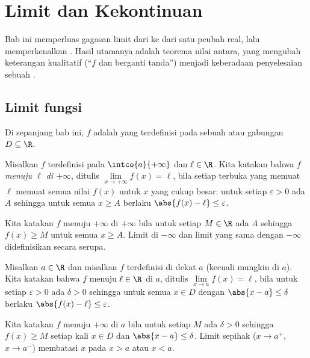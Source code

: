 \chapter{Limit dan Kekontinuan}\label{ch:g12:limcont}

Bab ini memperluas gagasan limit dari  ke  dari satu peubah
real, lalu memperkenalkan . Hasil utamanya adalah teorema
nilai antara, yang mengubah keterangan kualitatif (``$f$  dan berganti
tanda'') menjadi keberadaan penyelesaian sebuah .

\section{Limit fungsi}

Di sepanjang bab ini, $f$ adalah  yang terdefinisi pada sebuah 
atau gabungan  $D \subseteq \R$.

\begin{definition}\label{def:g12:limcont:liminf}
Misalkan $f$ terdefinisi pada  $\intco{a}{+\infty}$ dan $\ell \in \R$.
Kita katakan bahwa $f$ \emph{menuju $\ell$ di $+\infty$},
ditulis $\lim\limits_{x\to+\infty} f(x) = \ell$, bila setiap  terbuka
yang memuat $\ell$ memuat semua nilai $f(x)$ untuk $x$ yang cukup besar:
untuk setiap $\varepsilon > 0$ ada $A$ sehingga untuk semua $x \geq A$
berlaku $\abs{f(x) - \ell} \leq \varepsilon$.

Kita katakan $f$ menuju $+\infty$ di $+\infty$ bila untuk setiap $M \in \R$ ada
$A$ sehingga $f(x) \geq M$ untuk semua $x \geq A$. Limit di $-\infty$
dan limit yang sama dengan $-\infty$ didefinisikan secara serupa.
\end{definition}

\begin{definition}\label{def:g12:limcont:limpoint}
Misalkan $a \in \R$ dan misalkan $f$ terdefinisi di dekat $a$ (kecuali mungkin
di $a$). Kita katakan bahwa $f$ menuju $\ell \in \R$ di $a$, ditulis
$\lim\limits_{x \to a} f(x) = \ell$, bila untuk setiap $\varepsilon > 0$ ada
$\delta > 0$ sehingga untuk semua $x \in D$ dengan
$\abs{x - a} \leq \delta$ berlaku $\abs{f(x) - \ell} \leq \varepsilon$.

Kita katakan $f$ menuju $+\infty$ di $a$ bila untuk setiap $M$ ada $\delta > 0$
sehingga $f(x) \geq M$ setiap kali $x \in D$ dan $\abs{x - a} \leq \delta$.
Limit sepihak ($x \to a^+$, $x \to a^-$) membatasi $x$ pada $x > a$ atau
$x < a$.
\end{definition}

